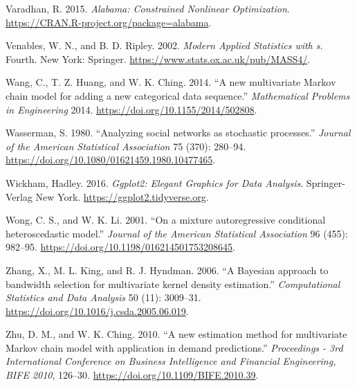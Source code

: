 \begin{CSLReferences}{1}{0}
\leavevmode{}%
Varadhan, R. 2015. \emph{Alabama: Constrained Nonlinear Optimization}. \url{https://CRAN.R-project.org/package=alabama}.

\leavevmode{}%
Venables, W. N., and B. D. Ripley. 2002. \emph{Modern Applied Statistics with s}. Fourth. New York: Springer. \url{https://www.stats.ox.ac.uk/pub/MASS4/}.

\leavevmode{}%
Wang, C., T. Z. Huang, and W. K. Ching. 2014. {``{A new multivariate Markov chain model for adding a new categorical data sequence}.''} \emph{Mathematical Problems in Engineering} 2014. \url{https://doi.org/10.1155/2014/502808}.

\leavevmode{}%
Wasserman, S. 1980. {``{Analyzing social networks as stochastic processes}.''} \emph{Journal of the American Statistical Association} 75 (370): 280--94. \url{https://doi.org/10.1080/01621459.1980.10477465}.

\leavevmode{}%
Wickham, Hadley. 2016. \emph{Ggplot2: Elegant Graphics for Data Analysis}. Springer-Verlag New York. \url{https://ggplot2.tidyverse.org}.

\leavevmode{}%
Wong, C. S., and W. K. Li. 2001. {``{On a mixture autoregressive conditional heteroscedastic model}.''} \emph{Journal of the American Statistical Association} 96 (455): 982--95. \url{https://doi.org/10.1198/016214501753208645}.

\leavevmode{}%
Zhang, X., M. L. King, and R. J. Hyndman. 2006. {``{A Bayesian approach to bandwidth selection for multivariate kernel density estimation}.''} \emph{Computational Statistics and Data Analysis} 50 (11): 3009--31. \url{https://doi.org/10.1016/j.csda.2005.06.019}.

\leavevmode{}%
Zhu, D. M., and W. K. Ching. 2010. {``{A new estimation method for multivariate Markov chain model with application in demand predictions}.''} \emph{Proceedings - 3rd International Conference on Business Intelligence and Financial Engineering, BIFE 2010}, 126--30. \url{https://doi.org/10.1109/BIFE.2010.39}.

\end{CSLReferences}


\address{%
Carolina Vasconcelos\\
NOVA Information Management School (NOVA IMS)\\%
Campus de Campolide, 1070-312 Lisboa, Portugal\\
%
%
%
\href{mailto:cvasconcelos@novaims.unl.pt}{\nolinkurl{cvasconcelos@novaims.unl.pt}}%
}

\address{%
Bruno Damásio\\
NOVA Information Management School (NOVA IMS)\\%
Campus de Campolide, 1070-312 Lisboa, Portugal\\
%
%
%
\href{mailto:bdamasio@novaims.unl.pt}{\nolinkurl{bdamasio@novaims.unl.pt}}%
}
